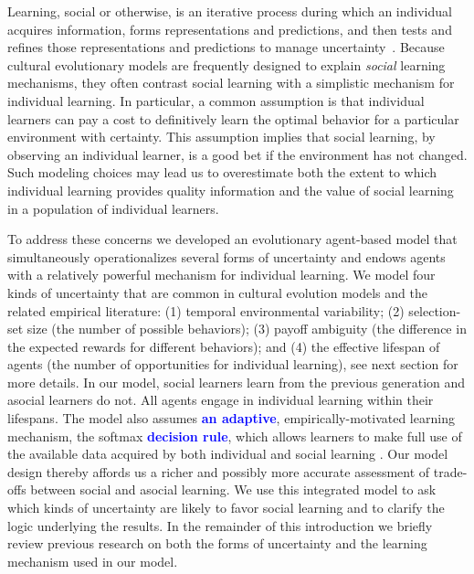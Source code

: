 \documentclass[letterpaper,11.5pt]{scrartcl}
\newcommand{\edit}[1]{{\bfseries \textcolor{blue} {#1}}}
\begin{document}
Learning, social or otherwise, is an iterative process during which an individual acquires information, forms representations and predictions, and then tests and refines those representations and predictions to manage uncertainty~\citep{jacobs2011bayesian,clark2013whatever}. Because cultural evolutionary models are frequently designed to explain \emph{social} learning mechanisms, they often contrast social learning with a simplistic mechanism for individual learning. In particular, a common assumption is that individual learners can pay a cost to definitively learn the optimal behavior for a particular environment with certainty. This assumption implies that social learning, by observing an individual learner, is a good bet if the environment has not changed. Such modeling choices may lead us to overestimate both the extent to which individual learning provides quality information and the value of social learning in a population of individual learners. %

To address these concerns we developed an evolutionary agent-based model that
simultaneously operationalizes several forms of uncertainty and endows agents
with a relatively powerful mechanism for individual learning. We model four kinds of
uncertainty that are common in cultural evolution models and the related empirical
literature:  (1) temporal environmental variability; (2) selection-set size (the number of possible behaviors); (3) payoff ambiguity
(the difference in the expected rewards for different behaviors); and (4) the effective lifespan of agents (the number of
opportunities for individual learning), see next section for more details. In our model, social learners learn from the previous
generation and asocial learners do not. All agents engage in individual learning
within their lifespans. The model also assumes \edit{an adaptive},
empirically-motivated learning mechanism, the softmax \edit{decision rule}, which allows learners to make full use of the available data acquired by both individual and social learning \citep{SuttonBartoBook}. Our model design thereby affords us a richer and possibly more accurate assessment of trade-offs between social and asocial learning. We use this integrated model to ask which kinds of uncertainty are likely to favor social learning and to clarify the logic underlying the results.
In the remainder of this introduction we briefly review previous research on both the forms of uncertainty and the learning mechanism used in our model. 
\end{document}
